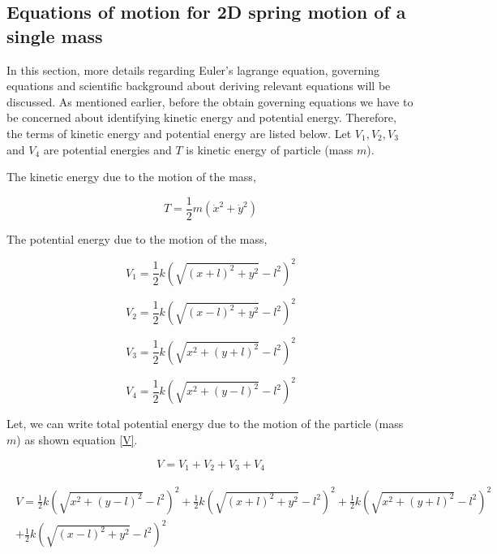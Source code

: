 \newpage 

\subsection{Equations of motion for 2D spring motion of a single mass}
\label{xo}

In this section, more details regarding Euler's lagrange equation, governing equations and scientific background about deriving relevant equations will be discussed. As mentioned earlier, before the obtain governing equations we have to be concerned about identifying kinetic energy and potential energy. Therefore, the terms of kinetic energy and potential energy are listed below. Let $V_1,V_2,V_3$ and $V_4$ are potential energies and $T$ is kinetic energy of particle (mass $m$). 

The kinetic energy due to the motion of the mass,

\begin{equation}
\label{k1}
    T = \frac{1}{2}m(\dot{x}^2 + \dot{y}^2)
\end{equation}

The potential energy due to the motion of the mass,

\begin{equation}
    \label{v1}
    V_1 = \frac{1}{2}k(\sqrt{(x+l)^2+y^2}- l^2 )^2
\end{equation}

\begin{equation}
    \label{v2}
    V_2 = \frac{1}{2}k(\sqrt{(x-l)^2+y^2}- l^2 )^2 
\end{equation}

\begin{equation}
    \label{v3}
    V_3 = \frac{1}{2}k(\sqrt{x^2+(y+l)^2}- l^2 )^2 
\end{equation}

\begin{equation}
    \label{v4}
    V_4 =  \frac{1}{2}k(\sqrt{x^2+(y-l)^2}- l^2 )^2
\end{equation}

Let, we can write total potential energy due to the motion of the particle (mass $m$) as shown equation \eqref{V}.

\begin{equation}
    V = V_1+V_2+V_3+V_4
\end{equation}

\begin{align}
\label{V}
\begin{split}
    V = \frac{1}{2}k(\sqrt{x^2+(y-l)^2}- l^2 )^2+ \frac{1}{2}k(\sqrt{(x+l)^2+y^2}- l^2 )^2 +  \frac{1}{2}k(\sqrt{x^2+(y+l)^2}- l^2 )^2    \\ + \frac{1}{2}k(\sqrt{(x-l)^2+y^2}- l^2 )^2 
    \end{split}
\end{align}

